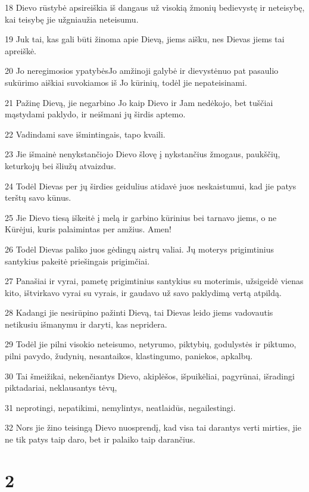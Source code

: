 \par 18 Dievo rūstybė apsireiškia iš dangaus už visokią žmonių bedievystę ir neteisybę, kai teisybę jie užgniaužia neteisumu. 
\par 19 Juk tai, kas gali būti žinoma apie Dievą, jiems aišku, nes Dievas jiems tai apreiškė. 
\par 20 Jo neregimosios ypatybės­Jo amžinoji galybė ir dievystė­nuo pat pasaulio sukūrimo aiškiai suvokiamos iš Jo kūrinių, todėl jie nepateisinami. 
\par 21 Pažinę Dievą, jie negarbino Jo kaip Dievo ir Jam nedėkojo, bet tuščiai mąstydami paklydo, ir neišmani jų širdis aptemo. 
\par 22 Vadindami save išmintingais, tapo kvaili. 
\par 23 Jie išmainė nenykstančiojo Dievo šlovę į nykstančius žmogaus, paukščių, keturkojų bei šliužų atvaizdus. 
\par 24 Todėl Dievas per jų širdies geidulius atidavė juos neskaistumui, kad jie patys terštų savo kūnus. 
\par 25 Jie Dievo tiesą iškeitė į melą ir garbino kūrinius bei tarnavo jiems, o ne Kūrėjui, kuris palaimintas per amžius. Amen! 
\par 26 Todėl Dievas paliko juos gėdingų aistrų valiai. Jų moterys prigimtinius santykius pakeitė priešingais prigimčiai. 
\par 27 Panašiai ir vyrai, pametę prigimtinius santykius su moterimis, užsigeidė vienas kito, ištvirkavo vyrai su vyrais, ir gaudavo už savo paklydimą vertą atpildą. 
\par 28 Kadangi jie nesirūpino pažinti Dievą, tai Dievas leido jiems vadovautis netikusiu išmanymu ir daryti, kas nepridera. 
\par 29 Todėl jie pilni visokio neteisumo, netyrumo, piktybių, godulystės ir piktumo, pilni pavydo, žudynių, nesantaikos, klastingumo, paniekos, apkalbų. 
\par 30 Tai šmeižikai, nekenčiantys Dievo, akiplėšos, išpuikėliai, pagyrūnai, išradingi piktadariai, neklausantys tėvų, 
\par 31 neprotingi, nepatikimi, nemylintys, neatlaidūs, negailestingi. 
\par 32 Nors jie žino teisingą Dievo nuosprendį, kad visa tai darantys verti mirties, jie ne tik patys taip daro, bet ir palaiko taip darančius.


\chapter{2}


